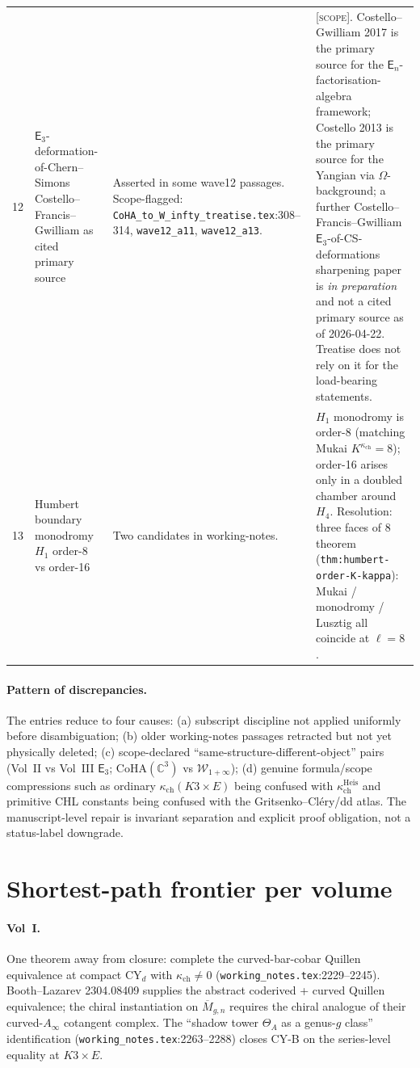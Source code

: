 \documentclass[11pt]{article}
\theoremstyle{definition}
\theoremstyle{remark}
\providecommand{\C}{\mathbb{C}}
\providecommand{\Ethree}{\mathsf{E}_3}
\providecommand{\En}{\mathsf{E}_n}
\providecommand{\kch}{\kappa_{\mathrm{ch}}}
\providecommand{\CoHA}{\mathrm{CoHA}}
\providecommand{\Winf}{\mathcal{W}_{1+\infty}}
\providecommand{\ClaimStatusScope}{\textsc{[scope]}}
\begin{document}
\begin{longtable}{@{}p{0.7cm}p{4.8cm}p{4.4cm}p{4.8cm}@{}}
12 & $\Ethree$-deformation-of-Chern--Simons Costello--Francis--Gwilliam
as cited primary source
& Asserted in some wave12 passages.
Scope-flagged: \texttt{CoHA\_to\_W\_infty\_treatise.tex}:308--314,
\texttt{wave12\_a11}, \texttt{wave12\_a13}.
& \ClaimStatusScope. Costello--Gwilliam 2017 is the primary source
for the $\En$-factorisation-algebra framework; Costello 2013 is the
primary source for the Yangian via $\Omega$-background; a further
Costello--Francis--Gwilliam $\Ethree$-of-CS-deformations sharpening
paper is \emph{in preparation} and not a cited primary source as of
2026-04-22. Treatise does not rely on it for the load-bearing
statements.
\\[0.3ex]

13 & Humbert boundary monodromy $H_1$ order-8 vs order-16
& Two candidates in working-notes.
& $H_1$ monodromy is order-8 (matching Mukai $K^{\kch} = 8$); order-16
arises only in a doubled chamber around $H_4$. Resolution: three
faces of $8$ theorem (\texttt{thm:humbert-order-K-kappa}): Mukai /
monodromy / Lusztig all coincide at $\ell = 8$.
\\
\bottomrule
\end{longtable}

\paragraph{Pattern of discrepancies.} The entries reduce to four causes:
(a) subscript discipline not applied uniformly before disambiguation;
(b) older working-notes passages retracted but not yet physically
deleted; (c) scope-declared ``same-structure-different-object'' pairs
(Vol~II vs Vol~III $\Ethree$; $\CoHA(\C^3)$ vs $\Winf$); (d) genuine
formula/scope compressions such as ordinary $\kch(K3\times E)$ being
confused with $\kch^{\mathrm{Heis}}$ and primitive CHL constants being
confused with the Gritsenko--Cl\'ery/dd atlas. The manuscript-level
repair is invariant separation and explicit proof obligation, not a
status-label downgrade.

\section{Shortest-path frontier per volume}

\paragraph{Vol~I.} One theorem away from closure: complete the
curved-bar-cobar Quillen equivalence at compact CY$_d$ with
$\kch\neq 0$ (\texttt{working\_notes.tex}:2229--2245). Booth--Lazarev
2304.08409 supplies the abstract coderived + curved Quillen
equivalence; the chiral instantiation on $\overline{M}_{g,n}$ requires
the chiral analogue of their curved-$A_\infty$ cotangent complex. The
``shadow tower $\Theta_A$ as a genus-$g$ class'' identification
(\texttt{working\_notes.tex}:2263--2288) closes CY-B on the series-level
equality at $K3\times E$.
\end{document}
